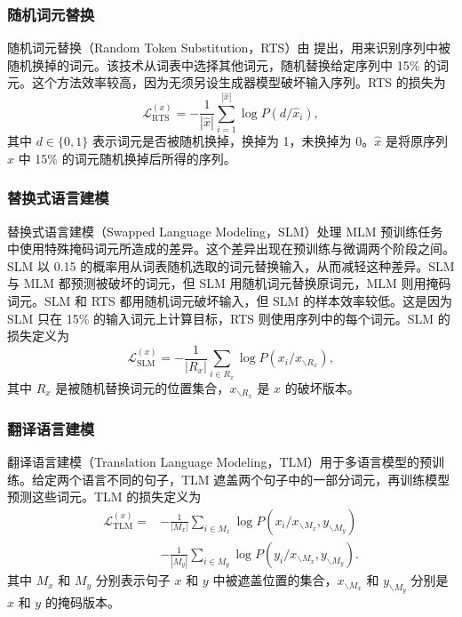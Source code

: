 \subsubsection{随机词元替换}
随机词元替换（Random Token Substitution，RTS）由 提出，用来识别序列中被随机换掉的词元。该技术从词表中选择其他词元，随机替换给定序列中 15\% 的词元。这个方法效率较高，因为无须另设生成器模型破坏输入序列。RTS 的损失为
\begin{equation}
\mathcal{L}_{\mathrm{RTS}}^{(x)}
=-\frac{1}{|\hat{x}|}\sum_{i=1}^{|\hat{x}|}\log P(d/\hat{x}_i),
\tag{2.25}
\end{equation}
其中 $d\in\{0,1\}$ 表示词元是否被随机换掉，换掉为 1，未换掉为 0。$\hat{x}$ 是将原序列 $x$ 中 15\% 的词元随机换掉后所得的序列。

\subsubsection{替换式语言建模}
替换式语言建模（Swapped Language Modeling，SLM）处理 MLM 预训练任务中使用特殊掩码词元所造成的差异。这个差异出现在预训练与微调两个阶段之间。SLM 以 0.15 的概率用从词表随机选取的词元替换输入，从而减轻这种差异。SLM 与 MLM 都预测被破坏的词元，但 SLM 用随机词元替换原词元，MLM 则用掩码词元。SLM 和 RTS 都用随机词元破坏输入，但 SLM 的样本效率较低。这是因为 SLM 只在 15\% 的输入词元上计算目标，RTS 则使用序列中的每个词元。SLM 的损失定义为
\begin{equation}
\mathcal{L}_{\mathrm{SLM}}^{(x)}
=-\frac{1}{|R_x|}\sum_{i\in R_x}\log P(x_i/x_{\backslash R_x}),
\tag{2.26}
\end{equation}
其中 $R_x$ 是被随机替换词元的位置集合，$x_{\backslash R_x}$ 是 $x$ 的破坏版本。

\subsubsection{翻译语言建模}
翻译语言建模（Translation Language Modeling，TLM）用于多语言模型的预训练。给定两个语言不同的句子，TLM 遮盖两个句子中的一部分词元，再训练模型预测这些词元。TLM 的损失定义为
\begin{equation}
\begin{aligned}
\mathcal{L}_{\mathrm{TLM}}^{(x)}
={}&-\frac{1}{|M_x|}\sum_{i\in M_x}\log P(x_i/x_{\backslash M_x},y_{\backslash M_y})\\
 &-\frac{1}{|M_y|}\sum_{i\in M_y}\log P(y_i/x_{\backslash M_x},y_{\backslash M_y}).
\end{aligned}
\tag{2.27}
\end{equation}
其中 $M_x$ 和 $M_y$ 分别表示句子 $x$ 和 $y$ 中被遮盖位置的集合，$x_{\backslash M_x}$ 和 $y_{\backslash M_y}$ 分别是 $x$ 和 $y$ 的掩码版本。


